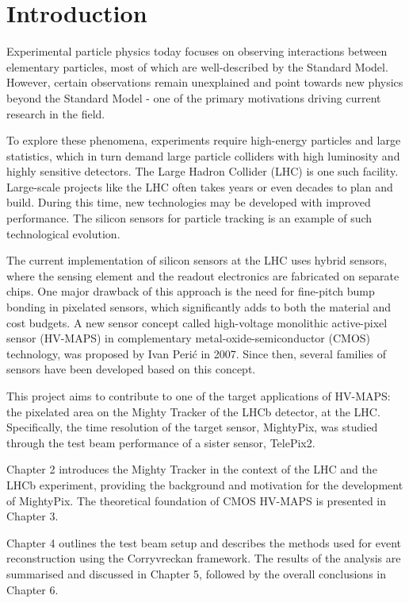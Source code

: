 
\chapter{Introduction}
\label{section1}
Experimental particle physics today focuses on observing interactions between elementary particles, most of which are well-described by the Standard Model. However, certain observations remain unexplained and point towards new physics beyond the Standard Model - one of the primary motivations driving current research in the field.

To explore these phenomena, experiments require high-energy particles and large statistics, which in turn demand large particle colliders with high luminosity and highly sensitive detectors. The Large Hadron Collider (LHC) is one such facility\cite{LHCTDR}. Large-scale projects like the LHC often takes years or even decades to plan and build. During this time, new technologies may be developed with improved performance. The silicon sensors for particle tracking is an example of such technological evolution\cite{SiliconSensor}. 

The current implementation of silicon sensors at the LHC uses hybrid sensors, where the sensing element and the readout electronics are fabricated on separate chips. One major drawback of this approach is the need for fine-pitch bump bonding in pixelated sensors, which significantly adds to both the material and cost budgets. A new sensor concept called high-voltage monolithic active-pixel sensor (HV-MAPS) in complementary metal-oxide-semiconductor (CMOS) technology, was proposed by Ivan Perić in 2007\cite{HVMAPS2}. Since then, several families of sensors have been developed based on this concept\cite{Mu3e}\cite{ATLASPix}\cite{MupixATLASPix}.

This project aims to contribute to one of the target applications of HV-MAPS: the pixelated area on the Mighty Tracker of the LHCb detector, at the LHC\cite{TDR}. Specifically, the time resolution of the target sensor, MightyPix\cite{Mightypix}, was studied through the test beam performance of a sister sensor, TelePix2\cite{Telepix}.

Chapter 2 introduces the Mighty Tracker in the context of the LHC and the LHCb experiment, providing the background and motivation for the development of MightyPix. The theoretical foundation of CMOS HV-MAPS is presented in Chapter 3.

Chapter 4 outlines the test beam setup and describes the methods used for event reconstruction using the Corryvreckan framework\cite{Corry}. The results of the analysis are summarised and discussed in Chapter 5, followed by the overall conclusions in Chapter 6.